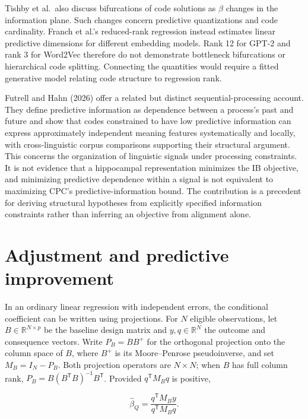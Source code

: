 \documentclass[11pt]{article}
\begin{document}
Tishby et al.~also discuss bifurcations of code solutions as \(\beta\)
changes in the information plane. Such changes concern predictive
quantizations and code cardinality. Franch et al.'s reduced-rank
regression instead estimates linear predictive dimensions for different
embedding models. Rank 12 for GPT-2 and rank 3 for Word2Vec therefore do
not demonstrate bottleneck bifurcations or hierarchical code splitting.
Connecting the quantities would require a fitted generative model
relating code structure to regression rank.

Futrell and Hahn (2026) offer a related but distinct
sequential-processing account. They define predictive information as
dependence between a process's past and future and show that codes
constrained to have low predictive information can express approximately
independent meaning features systematically and locally, with
cross-linguistic corpus comparisons supporting their structural
argument. This concerns the organization of linguistic signals under
processing constraints. It is not evidence that a hippocampal
representation minimizes the IB objective, and minimizing predictive
dependence within a signal is not equivalent to maximizing CPC's
predictive-information bound. The contribution is a precedent for
deriving structural hypotheses from explicitly specified information
constraints rather than inferring an objective from alignment alone.

\hypertarget{adjustment-and-predictive-improvement}{%
\section{Adjustment and predictive
improvement}\label{adjustment-and-predictive-improvement}}

In an ordinary linear regression with independent errors, the
conditional coefficient can be written using projections. For \(N\)
eligible observations, let \(B\in\mathbb R^{N\times p}\) be the baseline
design matrix and \(y,q\in\mathbb R^N\) the outcome and consequence
vectors. Write \(P_B=BB^+\) for the orthogonal projection onto the
column space of \(B\), where \(B^+\) is its Moore--Penrose
pseudoinverse, and set \(M_B=I_N-P_B\). Both projection operators are
\(N\times N\); when \(B\) has full column rank,
\(P_B=B(B^{\mathsf T}B)^{-1}B^{\mathsf T}\). Provided
\(q^{\mathsf T}M_Bq\) is positive,

\begin{equation}
\widehat\beta_Q=
\frac{q^{\mathsf T}M_B y}{q^{\mathsf T}M_B q}.
\end{equation}
\end{document}
